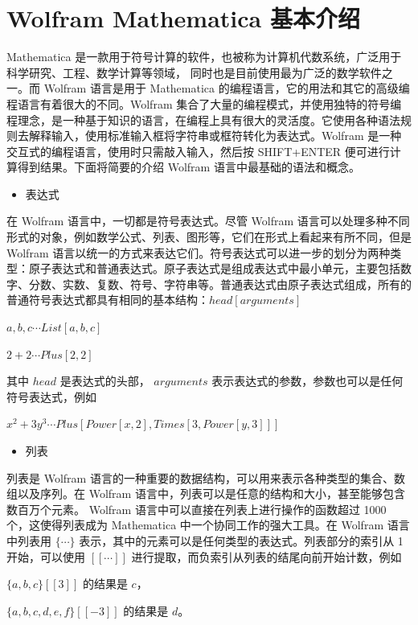\section{Wolfram Mathematica 基本介绍}
Mathematica 是一款用于符号计算的软件，也被称为计算机代数系统，广泛用于科学研究、工程、数学计算等领域， 同时也是目前使用最为广泛的数学软件之一。而 Wolfram 语言是用于 Mathematica 的编程语言，它的用法和其它的高级编程语言有着很大的不同。Wolfram 集合了大量的编程模式，并使用独特的符号编程理念，是一种基于知识的语言，在编程上具有很大的灵活度。它使用各种语法规则去解释输入，使用标准输入框将字符串或框符转化为表达式。Wolfram 是一种交互式的编程语言，使用时只需敲入输入，然后按 SHIFT+ENTER 便可进行计算得到结果。下面将简要的介绍 Wolfram 语言中最基础的语法和概念。
\begin{itemize}
    \item 表达式
\end{itemize}

在 Wolfram 语言中，一切都是符号表达式。尽管 Wolfram 语言可以处理多种不同形式的对象，例如数学公式、列表、图形等，它们在形式上看起来有所不同，但是 Wolfram 语言以统一的方式来表达它们。符号表达式可以进一步的划分为两种类型：原子表达式和普通表达式。原子表达式是组成表达式中最小单元，主要包括数字、分数、实数、复数、符号、字符串等。普通表达式由原子表达式组成，所有的普通符号表达式都具有相同的基本结构：$head[arguments]$

${a, b, c} \cdots List[a, b, c]$

$2 + 2 \cdots Plus[2, 2]$

其中 $head$ 是表达式的头部， $arguments$ 表示表达式的参数，参数也可以是任何符号表达式，例如

$x^2 + 3y^3 \cdots Plus[Power[x, 2], Times[3, Power[y, 3]]]$

\begin{itemize}
   \item 列表
\end{itemize}

列表是 Wolfram 语言的一种重要的数据结构，可以用来表示各种类型的集合、数组以及序列。在 Wolfram 语言中，列表可以是任意的结构和大小，甚至能够包含数百万个元素。 Wolfram 语言中可以直接在列表上进行操作的函数超过 1000 个，这使得列表成为 Mathematica 中一个协同工作的强大工具。在 Wolfram 语言中列表用 $\{\cdots\}$ 表示，其中的元素可以是任何类型的表达式。列表部分的索引从 1 开始，可以使用 $[[\cdots]]$ 进行提取，而负索引从列表的结尾向前开始计数，例如

$\{a, b, c\}[[3]]$ 的结果是 $c$，

$\{a, b, c, d, e, f\}[[-3]]$ 的结果是 $d$。

